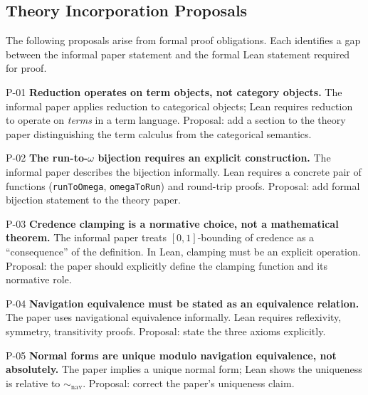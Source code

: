 \subsection{Theory Incorporation Proposals}

The following proposals arise from formal proof obligations. Each identifies a
gap between the informal paper statement and the formal Lean statement required
for proof.

\begin{proposal}{P-01}
\textbf{Reduction operates on term objects, not category objects.}
The informal paper applies reduction to categorical objects; Lean requires
reduction to operate on \emph{terms} in a term language. Proposal: add a
section to the theory paper distinguishing the term calculus from the categorical
semantics.
\end{proposal}

\begin{proposal}{P-02}
\textbf{The run-to-$\omega$ bijection requires an explicit construction.}
The informal paper describes the bijection informally. Lean requires a concrete
pair of functions (\texttt{runToOmega}, \texttt{omegaToRun}) and round-trip
proofs. Proposal: add formal bijection statement to the theory paper.
\end{proposal}

\begin{proposal}{P-03}
\textbf{Credence clamping is a normative choice, not a mathematical theorem.}
The informal paper treats $[0,1]$-bounding of credence as a ``consequence'' of
the definition. In Lean, clamping must be an explicit operation. Proposal:
the paper should explicitly define the clamping function and its normative role.
\end{proposal}

\begin{proposal}{P-04}
\textbf{Navigation equivalence must be stated as an equivalence relation.}
The paper uses navigational equivalence informally. Lean requires reflexivity,
symmetry, transitivity proofs. Proposal: state the three axioms explicitly.
\end{proposal}

\begin{proposal}{P-05}
\textbf{Normal forms are unique modulo navigation equivalence, not absolutely.}
The paper implies a unique normal form; Lean shows the uniqueness is relative to
\(\sim_\mathrm{nav}\). Proposal: correct the paper's uniqueness claim.
\end{proposal}

